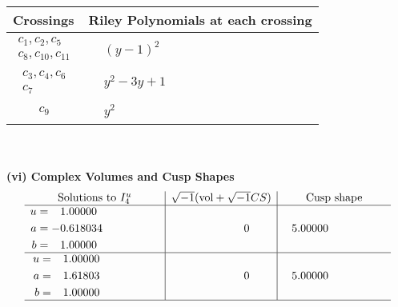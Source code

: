 \documentclass[1p]{elsarticle_modified}
\theoremstyle{definition}
\newcommand{\I}{\sqrt{-1}}
\begin{document}
\begin{tabular}{m{50pt}|m{274pt}}
Crossings & \hspace{64pt}Riley Polynomials at each crossing \\
\hline $$\begin{aligned}c_{1},c_{2},c_{5}\\c_{8},c_{10},c_{11}\end{aligned}$$&$\begin{aligned}
&(y-1)^2
\end{aligned}$\\
\hline $$\begin{aligned}c_{3},c_{4},c_{6}\\c_{7}\end{aligned}$$&$\begin{aligned}
&y^2-3 y+1
\end{aligned}$\\
\hline $$\begin{aligned}c_{9}\end{aligned}$$&$\begin{aligned}
&y^2
\end{aligned}$\\
\hline
\end{tabular}\\~\\
\newpage\flushleft \textbf{(vi) Complex Volumes and Cusp Shapes}
$$\begin{array}{c|c|c}  
\text{Solutions to }I^u_{4}& \I (\text{vol} + \sqrt{-1}CS) & \text{Cusp shape}\\
 \hline 
\begin{aligned}
u &= \phantom{-}1.00000\phantom{ +0.000000I} \\
a &= -0.618034\phantom{ +0.000000I} \\
b &= \phantom{-}1.00000\phantom{ +0.000000I}\end{aligned}
 & \phantom{-0.000000 } 0 & \phantom{-}5.00000\phantom{ +0.000000I} \\ \hline\begin{aligned}
u &= \phantom{-}1.00000\phantom{ +0.000000I} \\
a &= \phantom{-}1.61803\phantom{ +0.000000I} \\
b &= \phantom{-}1.00000\phantom{ +0.000000I}\end{aligned}
 & \phantom{-0.000000 } 0 & \phantom{-}5.00000\phantom{ +0.000000I}\\
 \hline 
 \end{array}$$\newpage\newpage\renewcommand{\arraystretch}{1}
\end{document}
